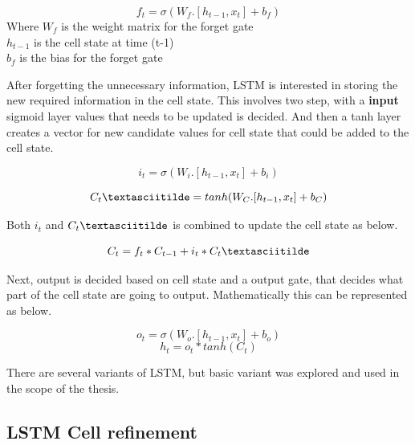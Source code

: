 \begin{equation}
f_t = \sigma(W_f. [h_{t-1}, x_t  ] + b_f)
\end{equation}
Where $W_f$ is the weight matrix for the forget gate \\
$h_{t-1}$ is the cell state at time (t-1) \\
$b_f$ is the bias for the forget gate

After forgetting the unnecessary information, LSTM is interested in storing the new required information in the cell state. This involves two step, with a \textbf{input} sigmoid layer values that needs to be updated is decided. And then a tanh layer creates a vector for new candidate values for cell state that could be added to the cell state. 

\begin{equation}
i_t = \sigma(W_i. [h_{t-1}, x_t  ] + b_i)
\end{equation}

\begin{equation}
C_t\textasciitilde = tanh(W_C. [h_{t-1}, x_t ] + b_C)
\end{equation}

Both $i_t$ and $C_t\textasciitilde$ is combined to update the cell state as below.

\begin{equation}
C_t = f_t * C_{t-1} + i_t * C_t\textasciitilde
\end{equation}

Next, output is decided based on cell state and a output gate, that decides what part of the cell state are going to output. Mathematically this can be represented as below.

\begin{equation}
o_t = \sigma(W_o. [h_{t-1}, x_t  ] + b_o)
\end{equation}
\begin{equation}
h_t = o_t  * tanh(C_t)
\end{equation}

There are several variants of LSTM, but basic variant was explored and used in the scope of the thesis.

\subsection{LSTM Cell refinement} \label{state_refinement}

